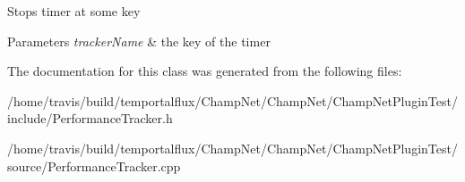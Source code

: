 Stops timer at some key 
\begin{DoxyParams}{Parameters}
{\em tracker\-Name} & the key of the timer \\
\hline
\end{DoxyParams}


The documentation for this class was generated from the following files\-:\begin{DoxyCompactItemize}
\item 
/home/travis/build/temportalflux/\-Champ\-Net/\-Champ\-Net/\-Champ\-Net\-Plugin\-Test/include/Performance\-Tracker.\-h\item 
/home/travis/build/temportalflux/\-Champ\-Net/\-Champ\-Net/\-Champ\-Net\-Plugin\-Test/source/Performance\-Tracker.\-cpp\end{DoxyCompactItemize}
